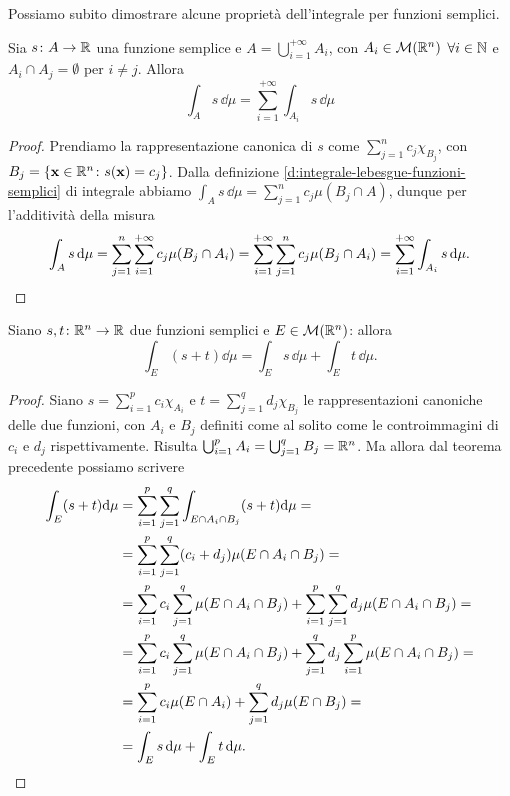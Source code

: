 Possiamo subito dimostrare alcune proprietà dell'integrale per funzioni semplici.
\begin{teorema} \label{t:integrale-funzioni-semplici-additivita-numerabile-insieme}
	Sia $s\colon A\to\mathbb{R}$ una funzione semplice e $A=\bigcup_{i=1}^{+\infty}A_i$, con $A_i\in\mathcal M(\mathbb{R}^n)$ $\forall i\in\mathbb{N}$ e $A_i\cap A_j=\emptyset$ per $i\neq j$.
	Allora
	\begin{equation}
		\int_As\,\dd\mu=\sum_{i=1}^{+\infty}\int_{A_i}s\,\dd\mu
		\label{eq:integrale-funzioni-semplici-additivita-numerabile-insieme}
	\end{equation}
\end{teorema}
\begin{proof}
	Prendiamo la rappresentazione canonica di $s$ come $\sum_{j=1}^nc_j\chi_{B_j}$, con $B_j=\{\mathbf{x}\in\mathbb{R}^n\colon s(\mathbf{x})=c_j\}$.
	Dalla definizione \ref{d:integrale-lebesgue-funzioni-semplici} di integrale abbiamo $\int_As\,\dd\mu=\sum_{j=1}^nc_j\mu(B_j\cap A)$, dunque per l'additività della misura
	\begin{equation}
		\int_As\,\textup{d}\mu=\sum_{j=1}^n\sum_{i=1}^{+\infty}c_j\mu(B_j\cap A_i)=\sum_{i=1}^{+\infty}\sum_{j=1}^nc_j\mu(B_j\cap A_i)=\sum_{i=1}^{+\infty}\int_{A_i}s\,\textup{d}\mu.\qedhere
	\end{equation}
\end{proof}
\begin{teorema} \label{t:integrale-funzioni-semplici-linearita}
	Siano $s,t\colon\mathbb{R}^n\to\mathbb{R}$ due funzioni semplici e $E\in\mathcal M(\mathbb{R}^n)$: allora
	\begin{equation}
		\int_E(s+t)\dd\mu=\int_Es\,\dd\mu+\int_Et\,\dd\mu.
		\label{eq:integrale-funzioni-semplici-linearita}
	\end{equation}
\end{teorema}
\begin{proof}
	Siano $s=\sum_{i=1}^pc_i\chi_{A_i}$ e $t=\sum_{j=1}^qd_j\chi_{B_j}$ le rappresentazioni canoniche delle due funzioni, con $A_i$ e $B_j$ definiti come al solito come le controimmagini di $c_i$ e $d_j$ rispettivamente.
	Risulta $\bigcup_{i=1}^pA_i=\bigcup_{j=1}^{q}B_j=\mathbb{R}^n$.
	Ma allora dal teorema precedente possiamo scrivere
	\begin{equation}
		\begin{split}
			\int_E(s+t)\textup{d}\mu&=\sum_{i=1}^p\sum_{j=1}^q\int_{E\cap A_i\cap B_j}(s+t)\textup{d}\mu=\\
			&=\sum_{i=1}^p\sum_{j=1}^q(c_i+d_j)\mu(E\cap A_i\cap B_j)=\\
			&=\sum_{i=1}^pc_i\sum_{j=1}^q\mu(E\cap A_i\cap B_j)+\sum_{i=1}^p\sum_{j=1}^qd_j\mu(E\cap A_i\cap B_j)=\\
			&=\sum_{i=1}^pc_i\sum_{j=1}^q\mu(E\cap A_i\cap B_j)+\sum_{j=1}^qd_j\sum_{i=1}^p\mu(E\cap A_i\cap B_j)=\\
			&=\sum_{i=1}^pc_i\mu(E\cap A_i)+\sum_{j=1}^qd_j\mu(E\cap B_j)=\\
			&=\int_Es\,\textup{d}\mu+\int_Et\,\textup{d}\mu.\qedhere
		\end{split}
	\end{equation}
\end{proof}

